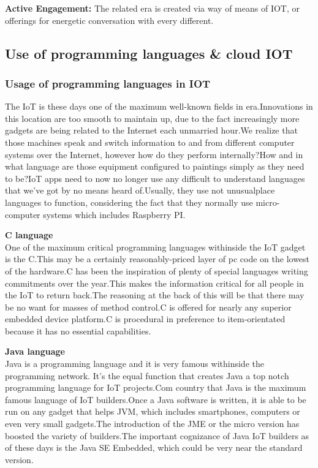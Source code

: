 \documentclass[12pt,a4paper]{article}
\begin{document}
\textbf{\large{Active Engagement:}} The related era is created via way of means of IOT, or offerings for
energetic conversation with every different.\\

\subsection{Use of programming languages \& cloud IOT}
\subsubsection{Usage of programming languages in IOT}
\hspace{0.5cm} The IoT is these days one of the maximum well-known fields in era.Innovations in
this location are too smooth to maintain up, due to the fact increasingly more gadgets are being related to the
Internet each unmarried hour.We realize that those machines speak and switch information to and
from different computer systems over the Internet, however how do they perform internally?How and in what
language are those equipment configured to paintings simply as they need to be?IoT apps need to now no longer use any
difficult to understand languages that we've got by no means heard of.Usually, they use not unusualplace languages to function,
considering the fact that they normally use micro-computer systems which includes Raspberry PI.

\vspace{0.1in}
\textbf{\large{C language}}\\

\hspace{0.5cm}One of the maximum critical programming languages withinside the IoT gadget is the C.This may be
a certainly reasonably-priced layer of pc code on the lowest of the hardware.C has been the inspiration
of plenty of special languages writing commitments over the year.This makes the information
critical for all people in the IoT to return back.The reasoning at the back of this will be that there may be no
want for masses of method control.C is offered for nearly any superior embedded device
platform.C is procedural in preference to item-orientated because it has no essential capabilities.

\vspace{0.1in}
\textbf{\large{Java language}}\\

\hspace{0.5cm}Java is a programming language and it is very famous withinside the programming network. It’s the equal function that creates Java a top notch programming language for IoT projects.Com country that Java is the maximum famous language of IoT builders.Once a Java software is written, it is able to be run on any gadget that helps JVM, which includes smartphones, computers or even very small gadgets.The introduction
of the JME or the micro version has boosted the variety of builders.The important cognizance of
Java IoT builders as of these days is the Java SE Embedded, which could be very near the standard
version.
\end{document}
